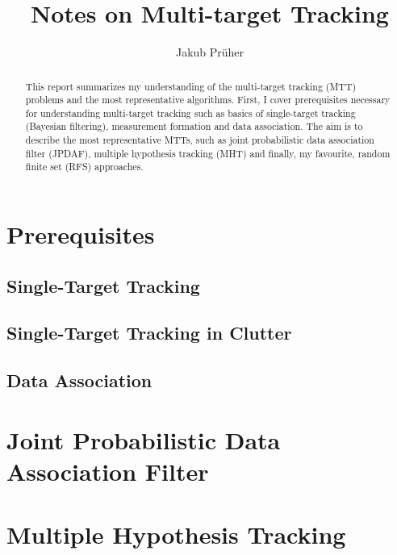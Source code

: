 \documentclass[
	a4paper,
	footheight=38pt
]{scrreprt}
\title{Notes on Multi-target Tracking}
\author{Jakub Prüher}
\begin{document}
\maketitle

\begin{abstract}
	This report summarizes my understanding of the multi-target tracking (MTT) problems and the most representative algorithms. 
	First, I cover prerequisites necessary for understanding multi-target tracking such as basics of single-target tracking (Bayesian filtering), measurement formation and data association.
	The aim is to describe the most representative MTTs, such as joint probabilistic data association filter (JPDAF), multiple hypothesis tracking (MHT) and finally, my favourite, random finite set (RFS) approaches.
\end{abstract}




\chapter{Prerequisites}\label{ch:prerequisites}


\section{Single-Target Tracking}\label{sec:single-target_tracking}


\section{Single-Target Tracking in Clutter}\label{sec:single-target_tracking_in_clutter}


\section{Data Association}\label{sec:data_association}




\chapter{Joint Probabilistic Data Association Filter}




\chapter{Multiple Hypothesis Tracking}
\end{document}
